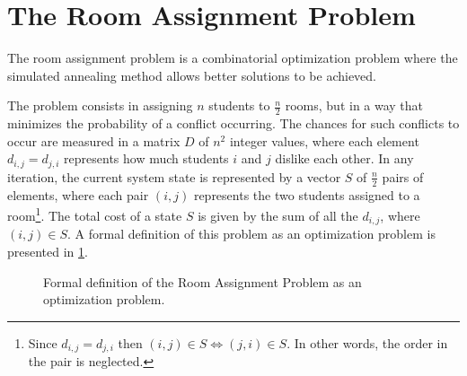 \section{The Room Assignment Problem}
The room assignment problem is a combinatorial optimization problem where the simulated annealing method allows better solutions to be achieved.

The problem consists in assigning $n$ students to $\frac{n}{2}$ rooms, but in a way that minimizes the probability of a conflict occurring. The chances for such conflicts to occur are measured in a matrix $D$ of $n^{2}$ integer values, where each element $d_{i,j} = d_{j,i}$ represents how much students $i$ and $j$ dislike each other. In any iteration, the current system state is represented by a vector $S$ of $\frac{n}{2}$ pairs of elements, where each pair $(i,j)$ represents the two students assigned to a room\footnote{Since $d_{i,j}=d_{j,i}$ then $(i,j)\in S\Leftrightarrow(j,i)\in S$. In other words, the order in the pair is neglected.}. The total cost of a state $S$ is given by the sum of all the $d_{i,j}$, where $(i,j)\in S$. A formal definition of this problem as an optimization problem is presented in \cref{fig:formaldef}.

\begin{figure}
	\begin{center}
	\end{center}
	\caption{Formal definition of the Room Assignment Problem as an optimization problem.}
	\label{fig:formaldef}
\end{figure}

